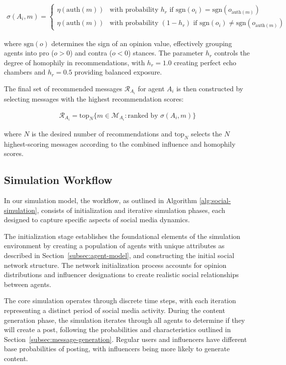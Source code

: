 \begin{align}
\sigma(A_i, m) = \begin{cases}
\eta(\text{auth}(m)) & \text{with probability } h_r \text{ if } \text{sgn}(o_i) = \text{sgn}(o_{\text{auth}(m)}) \\
\eta(\text{auth}(m)) & \text{with probability } (1-h_r) \text{ if } \text{sgn}(o_i) \neq \text{sgn}(o_{\text{auth}(m)})
\end{cases}
\end{align}

where $\text{sgn}(o)$ determines the sign of an opinion value, effectively grouping agents into pro ($o > 0$) and contra ($o < 0$) stances. The parameter $h_r$ controls the degree of homophily in recommendations, with $h_r = 1.0$ creating perfect echo chambers and $h_r = 0.5$ providing balanced exposure.

The final set of recommended messages $\mathcal{R}_{A_i}$ for agent $A_i$ is then constructed by selecting messages with the highest recommendation scores:

\begin{align}
\mathcal{R}_{A_i} = \text{top}_N\{m \in \mathcal{M}_{A_i} : \text{ranked by } \sigma(A_i, m)\}
\end{align}

where $N$ is the desired number of recommendations and $\text{top}_N$ selects the $N$ highest-scoring messages according to the combined influence and homophily scores.

\subsection{Simulation Workflow}

In our simulation model, the workflow, as outlined in Algorithm \ref{alg:social-simulation}, consists of initialization and iterative simulation phases, each designed to capture specific aspects of social media dynamics.

The initialization stage establishes the foundational elements of the simulation environment by creating a population of agents with unique attributes as described in Section~\ref{subsec:agent-model}, and constructing the initial social network structure. The network initialization process accounts for opinion distributions and influencer designations to create realistic social relationships between agents.

The core simulation operates through discrete time steps, with each iteration representing a distinct period of social media activity. During the content generation phase, the simulation iterates through all agents to determine if they will create a post, following the probabilities and characteristics outlined in Section~\ref{subsec:message-generation}. Regular users and influencers have different base probabilities of posting, with influencers being more likely to generate content.


